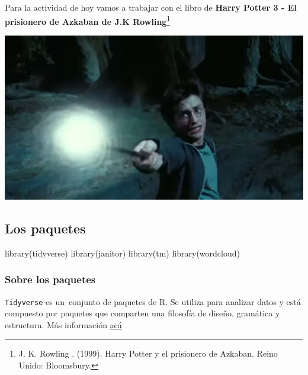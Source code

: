\documentclass[
  letterpaper,
  DIV=11,
  numbers=noendperiod]{scrreprt}
\newenvironment{Shaded}{\begin{snugshade}}{\end{snugshade}}
\newcommand{\FunctionTok}[1]{\textcolor[rgb]{0.28,0.35,0.67}{#1}}
\newcommand{\NormalTok}[1]{\textcolor[rgb]{0.00,0.23,0.31}{#1}}
\begin{document}
Para la actividad de hoy vamos a trabajar con el libro de \textbf{Harry
Potter 3 - El prisionero de Azkaban de J.K Rowling}\footnote{J. K.
  Rowling . (1999). Harry Potter y el prisionero de Azkaban. Reino
  Unido: Bloomsbury.}

\begin{center}
\includegraphics[width=6.17708in,height=\textheight,keepaspectratio]{clases/www/patronum.png}
\end{center}

\subsection{Los paquetes}\label{los-paquetes}

\begin{Shaded}
\begin{Highlighting}[]
\FunctionTok{library}\NormalTok{(tidyverse)}
\FunctionTok{library}\NormalTok{(janitor)}
\FunctionTok{library}\NormalTok{(tm)}
\FunctionTok{library}\NormalTok{(wordcloud)}
\end{Highlighting}
\end{Shaded}

\subsubsection{\texorpdfstring{\textbf{Sobre los
paquetes}}{Sobre los paquetes}}\label{sobre-los-paquetes}

\texttt{Tidyverse} es un~conjunto de paquetes de R. Se utiliza para
analizar datos y está compuesto por paquetes que comparten una filosofía
de diseño, gramática y estructura. Más información
\href{https://www.tidyverse.org/}{acá}
\end{document}
